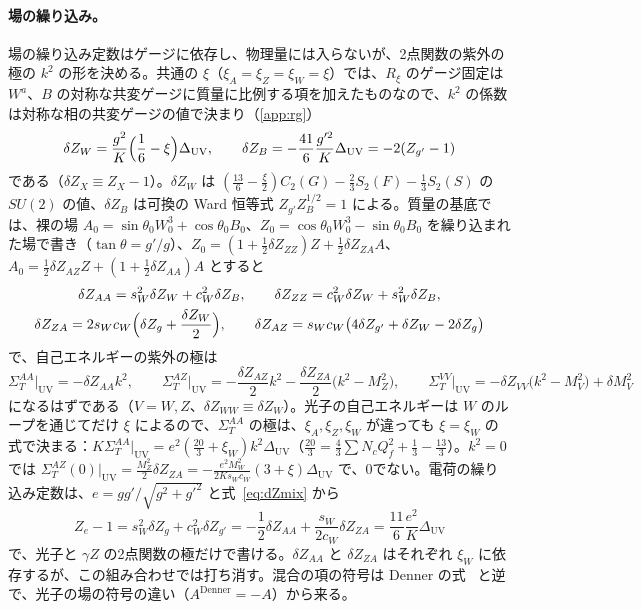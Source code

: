 \documentclass[a4paper,10pt]{ltjsarticle}
\newcommand{\DUV}{\Delta_{\mathrm{UV}}}
\newcommand{\sw}{s_W}
\newcommand{\cw}{c_W}
\begin{document}
\paragraph{場の繰り込み。}場の繰り込み定数はゲージに依存し、物理量には入らないが、2点関数の紫外の極の $k^2$ の形を決める。共通の $\xi$（$\xi_A=\xi_Z=\xi_W=\xi$）では、$R_\xi$ のゲージ固定は $W^a$、$B$ の対称な共変ゲージに質量に比例する項を加えたものなので、$k^2$ の係数は対称な相の共変ゲージの値で決まり（\ref{app:rg}）
\begin{equation}
\delta Z_W=\frac{g^2}K\Bigl(\frac16-\xi\Bigr)\DUV,\qquad \delta Z_B=-\frac{41}6\frac{g'^2}K\DUV=-2(Z_{g'}-1)
\label{eq:dZWB}
\end{equation}
である（$\delta Z_X\equiv Z_X-1$）。$\delta Z_W$ は $(\frac{13}6-\frac\xi2)C_2(G)-\frac23S_2(F)-\frac13S_2(S)$ の $SU(2)$ の値、$\delta Z_B$ は可換の Ward 恒等式 $Z_{g'}Z_B^{1/2}=1$ による。質量の基底では、裸の場 $A_0=\sin\theta_0W^3_0+\cos\theta_0B_0$、$Z_0=\cos\theta_0W^3_0-\sin\theta_0B_0$ を繰り込まれた場で書き（$\tan\theta=g'/g$）、$Z_0=(1+\frac12\delta Z_{ZZ})Z+\frac12\delta Z_{ZA}A$、$A_0=\frac12\delta Z_{AZ}Z+(1+\frac12\delta Z_{AA})A$ とすると
\begin{equation}
\begin{gathered}
\delta Z_{AA}=\sw^2\delta Z_W+\cw^2\delta Z_B,\qquad \delta Z_{ZZ}=\cw^2\delta Z_W+\sw^2\delta Z_B,\\
\delta Z_{ZA}=2\sw\cw\Bigl(\delta Z_g+\frac{\delta Z_W}2\Bigr),\qquad \delta Z_{AZ}=\sw\cw\bigl(4\delta Z_{g'}+\delta Z_W-2\delta Z_g\bigr)
\end{gathered}
\label{eq:dZmix}
\end{equation}
で、自己エネルギーの紫外の極は
\begin{equation}
\Sigma^{AA}_T\big|_{\mathrm{UV}}=-\delta Z_{AA}k^2,\qquad
\Sigma^{AZ}_T\big|_{\mathrm{UV}}=-\frac{\delta Z_{AZ}}2k^2-\frac{\delta Z_{ZA}}2\bigl(k^2-M_Z^2\bigr),\qquad
\Sigma^{VV}_T\big|_{\mathrm{UV}}=-\delta Z_{VV}\bigl(k^2-M_V^2\bigr)+\delta M_V^2
\label{eq:uvk2}
\end{equation}
になるはずである（$V=W,Z$、$\delta Z_{WW}\equiv\delta Z_W$）。光子の自己エネルギーは $W$ のループを通じてだけ $\xi$ によるので、$\Sigma^{AA}_T$ の極は、$\xi_A,\xi_Z,\xi_W$ が違っても $\xi=\xi_W$ の式で決まる：$K\Sigma^{AA}_T|_{\mathrm{UV}}=e^2(\frac{20}3+\xi_W)k^2\DUV$（$\frac{20}3=\frac43\sum N_cQ_f^2+\frac13-\frac{13}3$）。$k^2=0$ では $\Sigma^{AZ}_T(0)|_{\mathrm{UV}}=\frac{M_Z^2}2\delta Z_{ZA}=-\frac{e^2M_W^2}{2K\sw\cw}(3+\xi)\DUV$ で、0でない。電荷の繰り込み定数は、$e=gg'/\sqrt{g^2+g'^2}$ と式~\eqref{eq:dZmix} から
\begin{equation}
Z_e-1=\sw^2\delta Z_g+\cw^2\delta Z_{g'}=-\frac12\delta Z_{AA}+\frac{\sw}{2\cw}\delta Z_{ZA}=\frac{11}6\frac{e^2}K\DUV
\label{eq:dZe}
\end{equation}
で、光子と $\gamma Z$ の2点関数の極だけで書ける。$\delta Z_{AA}$ と $\delta Z_{ZA}$ はそれぞれ $\xi_W$ に依存するが、この組み合わせでは打ち消す。混合の項の符号は Denner の式~\cite{denner93} と逆で、光子の場の符号の違い（$A^{\mathrm{Denner}}=-A$）から来る。
\end{document}

